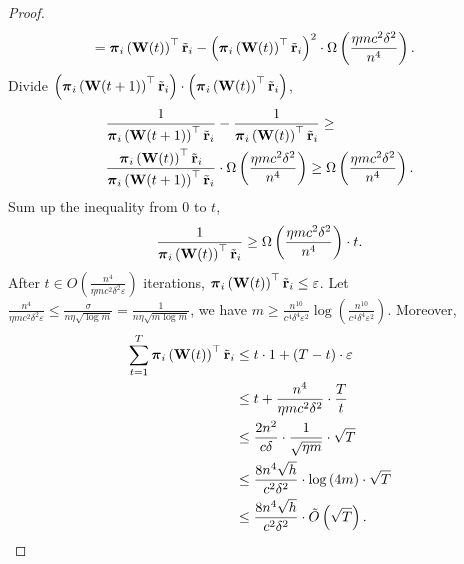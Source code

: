 \begin{proof}
\begin{equation*}
\begin{split}
    &= {\boldsymbol{\pi}}_i\left( {\mathbf{W}}(t) \right)^\top {\tilde{\mathbf{r}}}_i - \left( {\boldsymbol{\pi}}_i\left( {\mathbf{W}}(t) \right)^\top {\tilde{\mathbf{r}}}_i \right)^2 \cdot \Omega\left( \frac{\eta m c^2 \delta^2}{n^4} \right).
\end{split}
\end{equation*}
Divide $\left( {\boldsymbol{\pi}}_i\left( {\mathbf{W}}(t+1) \right)^\top {\tilde{\mathbf{r}}}_i\right) \cdot \left( {\boldsymbol{\pi}}_i\left( {\mathbf{W}}(t) \right)^\top {\tilde{\mathbf{r}}}_i \right)$,
\begin{equation*}
\begin{split}
    &\frac{1}{{\boldsymbol{\pi}}_i\left( {\mathbf{W}}(t+1) \right)^\top {\tilde{\mathbf{r}}}_i} - \frac{1}{{\boldsymbol{\pi}}_i\left( {\mathbf{W}}(t) \right)^\top {\tilde{\mathbf{r}}}_i} \ge \\
    &\frac{{\boldsymbol{\pi}}_i\left( {\mathbf{W}}(t) \right)^\top {\tilde{\mathbf{r}}}_i}{{\boldsymbol{\pi}}_i\left( {\mathbf{W}}(t+1) \right)^\top {\tilde{\mathbf{r}}}_i} \cdot \Omega\left( \frac{\eta m c^2 \delta^2}{n^4} \right) \ge \Omega\left( \frac{\eta m c^2 \delta^2}{n^4} \right).
\end{split}
\end{equation*}
Sum up the inequality from $0$ to $t$,
\begin{equation*}
\begin{split}
    \frac{1}{{\boldsymbol{\pi}}_i\left( {\mathbf{W}}(t) \right)^\top {\tilde{\mathbf{r}}}_i} \ge \Omega\left( \frac{\eta m c^2 \delta^2}{n^4} \right) \cdot t.
\end{split}
\end{equation*}
After $t \in O\left( \frac{n^4}{\eta m c^2 \delta^2 \varepsilon} \right)$ iterations, ${\boldsymbol{\pi}}_i\left( {\mathbf{W}}(t) \right)^\top {\tilde{\mathbf{r}}}_i \le \varepsilon$. Let $\frac{n^4}{\eta m c^2 \delta^2 \varepsilon} \le \frac{\sigma}{n \eta \sqrt{\log{m}}} = \frac{1}{n \eta \sqrt{m \log{m}}}$, we have $m \ge \frac{n^{10}}{c^4 \delta^4 \varepsilon^2}\log{\left( \frac{n^{10}}{c^4 \delta^4 \varepsilon^2} \right)}$. Moreover,
\begin{equation*}
\begin{split}
    \sum\limits_{t=1}^{T}{ {\boldsymbol{\pi}}_i\left( {\mathbf{W}}(t) \right)^\top {\tilde{\mathbf{r}}}_i } &\le t \cdot 1 + \left(T - t\right) \cdot \varepsilon \\
    &\le t + \frac{n^4}{\eta m c^2 \delta^2} \cdot \frac{T}{t} \\
    &\le \frac{2 n^2}{c \delta} \cdot \frac{1}{\sqrt{\eta m}} \cdot \sqrt{T} \\
    &\le \frac{8 n^4 \sqrt{h}}{c^2 \delta^2} \cdot \log{\left(4m\right)} \cdot \sqrt{T} \\
    &\le \frac{8 n^4 \sqrt{h}}{c^2 \delta^2} \cdot \tilde{O}\left(\sqrt{T}\right). \qedhere
\end{split}
\end{equation*}
\end{proof}



